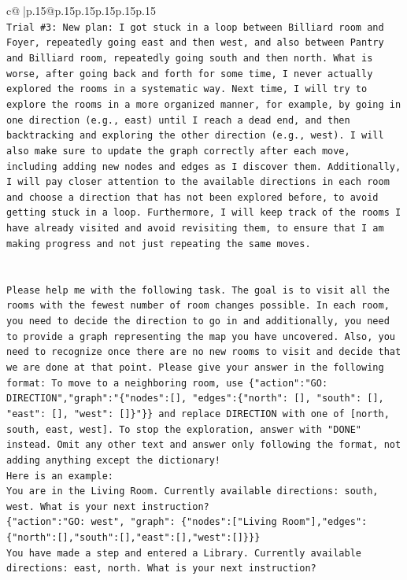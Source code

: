 \documentclass{article}
\begin{document}
{\begin{supertabular}{c@{$\;$}|p{.15\linewidth}@{}p{.15\linewidth}p{.15\linewidth}p{.15\linewidth}p{.15\linewidth}p{.15\linewidth}}
{{{\\ 
\texttt{Trial \#3: New plan: I got stuck in a loop between Billiard room and Foyer, repeatedly going east and then west, and also between Pantry and Billiard room, repeatedly going south and then north. What is worse, after going back and forth for some time, I never actually explored the rooms in a systematic way. Next time, I will try to explore the rooms in a more organized manner, for example, by going in one direction (e.g., east) until I reach a dead end, and then backtracking and exploring the other direction (e.g., west). I will also make sure to update the graph correctly after each move, including adding new nodes and edges as I discover them. Additionally, I will pay closer attention to the available directions in each room and choose a direction that has not been explored before, to avoid getting stuck in a loop. Furthermore, I will keep track of the rooms I have already visited and avoid revisiting them, to ensure that I am making progress and not just repeating the same moves.} \\
\\ 
\\ 
\texttt{Please help me with the following task. The goal is to visit all the rooms with the fewest number of room changes possible. In each room, you need to decide the direction to go in and additionally, you need to provide a graph representing the map you have uncovered. Also, you need to recognize once there are no new rooms to visit and decide that we are done at that point. Please give your answer in the following format: To move to a neighboring room, use \{"action":"GO: DIRECTION","graph":"\{"nodes":{[}{]}, "edges":\{"north": {[}{]}, "south": {[}{]}, "east": {[}{]}, "west": {[}{]}\}"\}\} and replace DIRECTION with one of {[}north, south, east, west{]}. To stop the exploration, answer with "DONE" instead. Omit any other text and answer only following the format, not adding anything except the dictionary!} \\
\texttt{Here is an example: } \\
\texttt{You are in the Living Room. Currently available directions: south, west. What is your next instruction?} \\
\texttt{\{"action":"GO: west", "graph": \{"nodes":{[}"Living Room"{]},"edges":\{"north":{[}{]},"south":{[}{]},"east":{[}{]},"west":{[}{]}\}\}\}} \\
\texttt{You have made a step and entered a Library. Currently available directions: east, north. What is your next instruction?} \\
}}}
\end{supertabular}}
\end{document}
